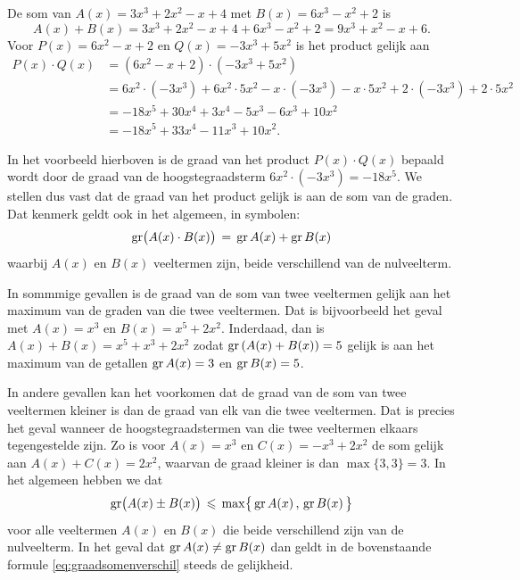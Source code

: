 \documentclass{ximera}
\begin{document}
\begin{example} 
De som van $A(x) = 3x^3+2x^2-x+4$ met $B(x) = 6x^3-x^2+2$ is 
\[
A(x) + B(x) = 3x^3+2x^2-x+4 + 6x^3-x^2+2 = 9x^3 + x^2 - x + 6.
\]
Voor $P(x) = 6x^2-x+2$ en $Q(x) = -3x^3+5x^2$ is het product gelijk aan
\begin{align*}
P(x) \cdot Q(x) 
& = (6x^2-x+2) \cdot (-3x^3+5x^2) \\
& = 6x^2 \cdot (-3x^3) + 6x^2\cdot 5x^2 - x \cdot(-3x^3) - x \cdot 5x^2 + 2 \cdot(-3x^3) + 2 \cdot 5x^2 \\
& = -18x^5 + 30x^4 + 3x^4 - 5x^3 - 6x^3 + 10x^2 \\
& = -18x^5 + 33x^4 - 11x^3 + 10x^2.
\end{align*}
\end{example} 

In het voorbeeld hierboven is de graad van het product $P(x) \cdot Q(x)$ bepaald wordt door de graad van de hoogstegraadsterm $6x^2 \cdot (-3x^3) = -18 x^{5}$. We stellen dus vast dat de graad van het product gelijk is aan de som van de graden. Dat kenmerk geldt ook in het algemeen, in symbolen: 
\begin{equation} \label{eq:graadproduct}
\operatorname{gr}\bigl( A(x) \cdot B(x) \bigr) \, = \, \operatorname{gr} A(x) + \operatorname{gr} B(x)
\end{equation}
waarbij $A(x)$ en $B(x)$ veeltermen zijn, beide verschillend van de nulveelterm. 

In sommmige gevallen is de graad van de som van twee veeltermen gelijk aan het maximum van de graden van die twee veeltermen. Dat is bijvoorbeeld het geval met 
$A(x) = x^3$ en $B(x) = x^5 + 2x^2$. Inderdaad, dan is $A(x) + B(x) = x^5 + x^3 + 2x^2$ zodat $\operatorname{gr}\left(A(x) + B(x)\right) = 5$ gelijk is aan het maximum van de getallen $\operatorname{gr} A(x) = 3$ en $\operatorname{gr} B(x) = 5$. %

In andere gevallen kan het voorkomen dat de graad van de som van twee veeltermen kleiner is dan de graad van elk van die twee veeltermen. Dat is precies het geval wanneer de hoogste\-graadstermen van die twee veeltermen elkaars tegengestelde zijn. Zo is voor $A(x) = x^3$ en $C(x) = -x^3 + 2x^2$ de som gelijk aan $A(x) + C(x) = 2x^2$, waarvan de graad kleiner is dan $\max\{3,3\} = 3$. In het algemeen hebben we dat  
\begin{equation} \label{eq:graadsomenverschil}
\operatorname{gr}\bigl( A(x) \pm B(x) \bigr) \, \leqslant \, \max \bigl\{ \,\operatorname{gr} A(x)\, , \, \operatorname{gr} B(x) \, \bigr\}
\end{equation}
voor alle veeltermen $A(x)$ en $B(x)$ die beide verschillend zijn van de nulveelterm. In het geval dat $\operatorname{gr} A(x) \neq \operatorname{gr} B(x)$ dan geldt in de bovenstaande formule \eqref{eq:graadsomenverschil} steeds de gelijkheid. 
\end{document}
